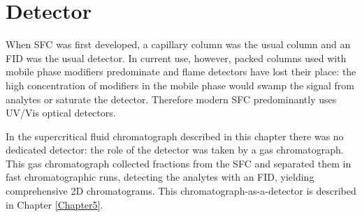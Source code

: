 \section{Detector}

When SFC was first developed, a capillary column was the usual column and an FID
was the usual detector. In current use, however, packed columns used with mobile
phase modifiers predominate and flame detectors have lost their place:
the high concentration of modifiers in the mobile phase would swamp the signal
from analytes or saturate the detector. Therefore modern SFC predominantly uses
UV/Vis optical detectors.

In the supercritical fluid chromatograph described in this chapter there was no
dedicated detector: the role of the detector was taken by a gas chromatograph.
This gas chromatograph collected fractions from the SFC and separated them in
fast chromatographic runs, detecting the analytes with an FID, yielding
comprehensive 2D chromatograms. This chromatograph-as-a-detector is described in
Chapter \ref{Chapter5}.
